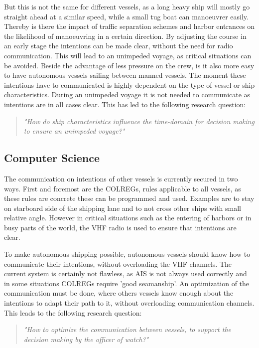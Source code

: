 But this is not the same for different vessels, as a long heavy ship will mostly go straight ahead at a similar speed, while a small tug boat can manoeuvrer easily. Thereby is there the impact of traffic separation schemes and harbor entrances on the likelihood of manoeuvring in a certain direction. 
By adjusting the course in an early stage the intentions can be made clear, without the need for radio communication. This will lead to an unimpeded voyage, as critical situations can be avoided. Beside the advantage of less pressure on the crew, is it also more easy to have autonomous vessels sailing between manned vessels.
The moment these intentions have to communicated is highly dependent on the type of vessel or ship characteristics. During an unimpeded voyage it is not needed to communicate as intentions are in all cases clear. This has led to the following research question:

\begin{quotation}
	\Large
	\emph{"How do ship characteristics influence the time-domain for decision making to ensure an unimpeded voyage?"} 
\end{quotation}

\subsection*{Computer Science}
The communication on intentions of other vessels is currently secured in two ways. First and foremost are the COLREGs, rules applicable to all vessels, as these rules are concrete these can be programmed and used. Examples are to stay on starboard side of the shipping lane and to not cross other ships with small relative angle. However in critical situations such as the entering of harbors or in busy parts of the world, the VHF radio is used to ensure that intentions are clear.

To make autonomous shipping possible, autonomous vessels should know how to communicate their intentions, without overloading the VHF channels. The current system is certainly not flawless, as \ac{AIS} is not always used correctly and in some situations \ac{COLREGs} require 'good seamanship'.
An optimization of the communication must be done, where others vessels know enough about the intentions to adapt their path to it, without overloading communication channels.
This leads to the following research question:

\begin{quotation}
	\Large
	\emph{"How to optimize the communication between vessels, to support the decision making by the officer of watch?"}
\end{quotation}


